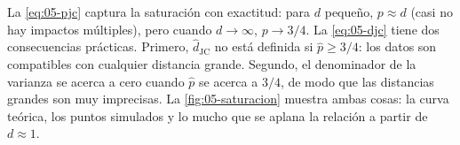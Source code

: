\begin{simbolos}
\end{simbolos}

La \cref{eq:05-pjc} captura la saturación con exactitud: para $d$ pequeño, $p\approx d$ (casi no hay impactos múltiples), pero cuando $d\to\infty$, $p\to 3/4$. La \cref{eq:05-djc} tiene dos consecuencias prácticas. Primero, $\hat d_{\text{JC}}$ no está definida si $\hat p\ge 3/4$: los datos son compatibles con cualquier distancia grande. Segundo, el denominador de la varianza se acerca a cero cuando $\hat p$ se acerca a $3/4$, de modo que las distancias grandes son muy imprecisas. La \cref{fig:05-saturacion} muestra ambas cosas: la curva teórica, los puntos simulados y lo mucho que se aplana la relación a partir de $d\approx 1$.

